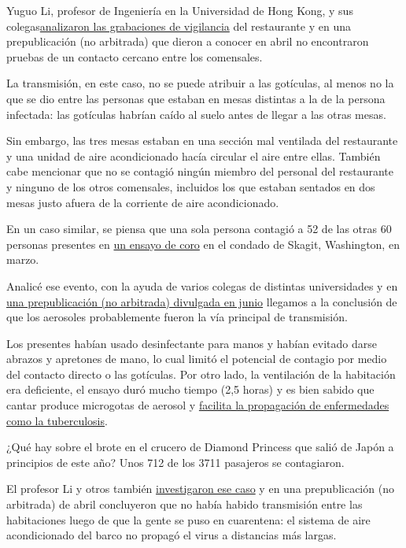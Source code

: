 Yuguo Li, profesor de Ingeniería en la Universidad de Hong Kong, y sus
colegas\href{https://www.medrxiv.org/content/10.1101/2020.04.16.20067728v1}{analizaron
las grabaciones de vigilancia} del restaurante y en una prepublicación
(no arbitrada) que dieron a conocer en abril no encontraron pruebas de
un contacto cercano entre los comensales.

La transmisión, en este caso, no se puede atribuir a las gotículas, al
menos no la que se dio entre las personas que estaban en mesas distintas
a la de la persona infectada: las gotículas habrían caído al suelo antes
de llegar a las otras mesas.

Sin embargo, las tres mesas estaban en una sección mal ventilada del
restaurante y una unidad de aire acondicionado hacía circular el aire
entre ellas. También cabe mencionar que no se contagió ningún miembro
del personal del restaurante y ninguno de los otros comensales,
incluidos los que estaban sentados en dos mesas justo afuera de la
corriente de aire acondicionado.

En un caso similar, se piensa que una sola persona contagió a 52 de las
otras 60 personas presentes en
\href{https://www.nytimes3xbfgragh.onion/2020/05/12/health/coronavirus-choir.html}{un
ensayo de coro} en el condado de Skagit, Washington, en marzo.

Analicé ese evento, con la ayuda de varios colegas de distintas
universidades y en
\href{https://www.medrxiv.org/content/10.1101/2020.06.15.20132027v2}{una
prepublicación (no arbitrada) divulgada en junio} llegamos a la
conclusión de que los aerosoles probablemente fueron la vía principal de
transmisión.

Los presentes habían usado desinfectante para manos y habían evitado
darse abrazos y apretones de mano, lo cual limitó el potencial de
contagio por medio del contacto directo o las gotículas. Por otro lado,
la ventilación de la habitación era deficiente, el ensayo duró mucho
tiempo (2,5 horas) y es bien sabido que cantar produce microgotas de
aerosol y
\href{https://www.atsjournals.org/doi/abs/10.1164/arrd.1968.98.2.297}{facilita
la propagación de enfermedades como la tuberculosis}.

¿Qué hay sobre el brote en el crucero de Diamond Princess que salió de
Japón a principios de este año? Unos 712 de los 3711 pasajeros se
contagiaron.

El profesor Li y otros también
\href{https://www.medrxiv.org/content/10.1101/2020.04.09.20059113v1}{investigaron
ese caso} y en una prepublicación (no arbitrada) de abril concluyeron
que no había habido transmisión entre las habitaciones luego de que la
gente se puso en cuarentena: el sistema de aire acondicionado del barco
no propagó el virus a distancias más largas.

